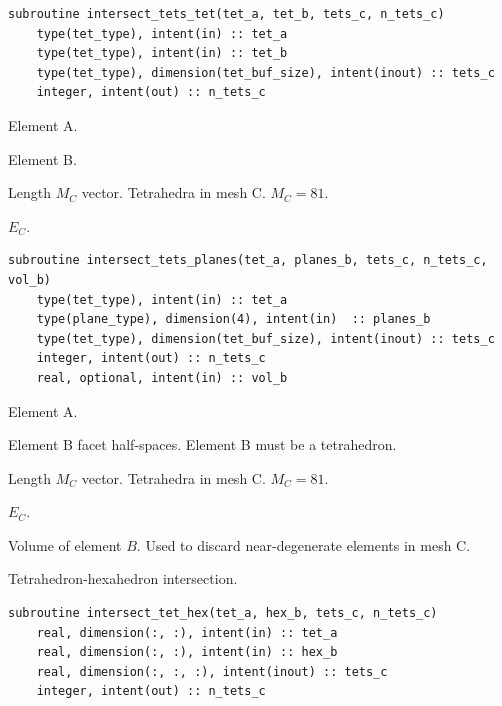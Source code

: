 \documentclass{article}
\begin{document}
\begin{lstlisting}[language=FORTRAN]
  subroutine intersect_tets_tet(tet_a, tet_b, tets_c, n_tets_c)
    type(tet_type), intent(in) :: tet_a
    type(tet_type), intent(in) :: tet_b
    type(tet_type), dimension(tet_buf_size), intent(inout) :: tets_c
    integer, intent(out) :: n_tets_c
\end{lstlisting}

\begin{description}[font=\ttfamily\bfseries,leftmargin=2.2\parindent,labelindent=1.7\parindent,noitemsep]
  \item[tet\_a] Element A.
  \item[tet\_b] Element B.
  \item[tets\_c] Length $M_C$ vector. Tetrahedra in mesh C. $M_C = 81$.
  \item[n\_tets\_c] $E_C$.
\end{description}

\begin{lstlisting}[language=FORTRAN]
  subroutine intersect_tets_planes(tet_a, planes_b, tets_c, n_tets_c, vol_b)
    type(tet_type), intent(in) :: tet_a
    type(plane_type), dimension(4), intent(in)  :: planes_b
    type(tet_type), dimension(tet_buf_size), intent(inout) :: tets_c
    integer, intent(out) :: n_tets_c
    real, optional, intent(in) :: vol_b
\end{lstlisting}

\begin{description}[font=\ttfamily\bfseries,leftmargin=2.2\parindent,labelindent=1.7\parindent,noitemsep]
  \item[tet\_a] Element A.
  \item[planes\_b] Element B facet half-spaces. Element B must be a tetrahedron.
  \item[tets\_c] Length $M_C$ vector. Tetrahedra in mesh C. $M_C = 81$.
  \item[n\_tets\_c] $E_C$.
  \item[vol\_b] Volume of element $B$. Used to discard near-degenerate elements
    in mesh C.
\end{description}

\noindent Tetrahedron-hexahedron intersection.

\begin{lstlisting}[language=FORTRAN]
  subroutine intersect_tet_hex(tet_a, hex_b, tets_c, n_tets_c)
    real, dimension(:, :), intent(in) :: tet_a
    real, dimension(:, :), intent(in) :: hex_b
    real, dimension(:, :, :), intent(inout) :: tets_c
    integer, intent(out) :: n_tets_c
\end{lstlisting}
\end{document}
